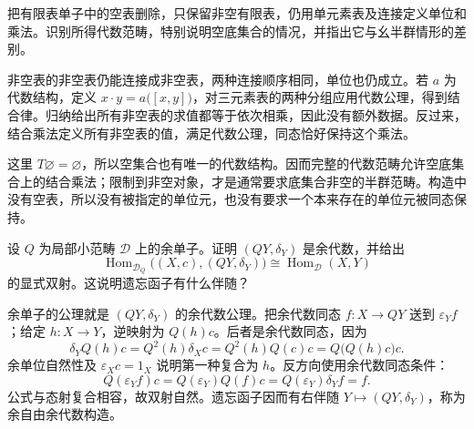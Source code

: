 \begin{exercise}\label{b4:ex:A-nonempty-list}
	把有限表单子中的空表删除，只保留非空有限表，仍用单元素表及连接定义单位和乘法。识别所得代数范畴，特别说明空底集合的情况，并指出它与幺半群情形的差别。
\end{exercise}
\begin{solution}
	非空表的非空表仍能连接成非空表，两种连接顺序相同，单位也仍成立。若 \(a\) 为代数结构，定义 \(x\cdot y=a\bigl([x,y]\bigr)\)，对三元素表的两种分组应用代数公理，得到结合律。归纳给出所有非空表的求值都等于依次相乘，因此没有额外数据。反过来，结合乘法定义所有非空表的值，满足代数公理，同态恰好保持这个乘法。

	这里 \(T\varnothing=\varnothing\)，所以空集合也有唯一的代数结构。因而完整的代数范畴允许空底集合上的结合乘法；限制到非空对象，才是通常要求底集合非空的半群范畴。构造中没有空表，所以没有被指定的单位元，也没有要求一个本来存在的单位元被同态保持。
\end{solution}

\begin{exercise}\label{b4:ex:A-cofree-coalgebra}
	设 \(Q\) 为局部小范畴 \(\mathcal D\) 上的余单子。证明 \((QY,\delta_Y)\) 是余代数，并给出
	\[
		\operatorname{Hom}_{\mathcal D_Q} \bigl((X,c),(QY,\delta_Y)\bigr) \cong\operatorname{Hom}_{\mathcal D}(X,Y)
	\]
	的显式双射。这说明遗忘函子有什么伴随？
\end{exercise}
\begin{solution}
	余单子的公理就是 \((QY,\delta_Y)\) 的余代数公理。把余代数同态 \(f:X\to QY\) 送到 \(\varepsilon_Yf\)；给定 \(h:X\to Y\)，逆映射为 \(Q(h)c\)。后者是余代数同态，因为
	\[
		\delta_YQ(h)c=Q^2(h)\delta_Xc =Q^2(h)Q(c)c=Q\bigl(Q(h)c\bigr)c.
	\]
	余单位自然性及 \(\varepsilon_Xc=1_X\) 说明第一种复合为 \(h\)。反方向使用余代数同态条件：
	\[
		Q(\varepsilon_Yf)c =Q(\varepsilon_Y)Q(f)c =Q(\varepsilon_Y)\delta_Yf=f.
	\]
	公式与态射复合相容，故双射自然。遗忘函子因而有右伴随 \(Y\mapsto(QY,\delta_Y)\)，称为余自由余代数构造。
\end{solution}


